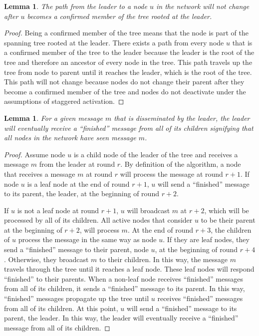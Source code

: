 \documentclass[english]{article}
\newtheorem{lemma}[theorem]{Lemma}
\begin{document}
\begin{lemma}
\label{StaggeredStablePath}
The path from the leader to a node $u$ in the network will not change after $u$ becomes a confirmed member of the tree rooted at the leader.
\end{lemma}
\begin{proof}
Being a confirmed member of the tree means that the node is part of the spanning tree rooted at the leader. There exists a path from every node $u$ that is a confirmed member of the tree to the leader because the leader is the root of the tree and therefore an ancestor of every node in the tree. This path travels up the tree from node to parent until it reaches the leader, which is the root of the tree. This path will not change because nodes do not change their parent after they become a confirmed member of the tree and nodes do not deactivate under the assumptions of staggered activation.
\end{proof}

\begin{lemma}
\label{StaggeredSpanningTreePropagation}
For a given message $m$ that is disseminated by the leader, the leader will eventually receive a ``finished'' message from all of its children signifying that all nodes in the network have seen message $m$.
\end{lemma}
\begin{proof}

Assume node $u$ is a child node of the leader of the tree and receives a message $m$ from the leader at round $r$. By definition of the algorithm, a node that receives a message $m$ at round $r$ will process the message at round $r+1$. If node $u$ is a leaf node at the end of round $r+1$, $u$ will send a ``finished'' message to its parent, the leader, at the beginning of round $r+2$.

If $u$ is not a leaf node at round $r+1$, $u$ will broadcast $m$ at $r+2$, which will be processed by all of its children. All active nodes that consider $u$ to be their parent at the beginning of $r+2$, will process $m$. At the end of round $r+3$, the children of $u$ process the message in the same way as node $u$. If they are leaf nodes, they send a ``finished'' message to their parent, node $u$, at the beginning of round $r+4$. Otherwise, they broadcast $m$ to their children. In this way, the message $m$ travels through the tree until it reaches a leaf node. These leaf nodes will respond ``finished'' to their parents. When a non-leaf node receives ``finished'' messages from all of its children, it sends a ``finished'' message to its parent. In this way, ``finished'' messages propagate up the tree until $u$ receives ``finished'' messages from all of its children. At this point, $u$ will send a ``finished'' message to its parent, the leader. In this way, the leader will eventually receive a ``finished'' message from all of its children.

\end{proof}
\end{document}
